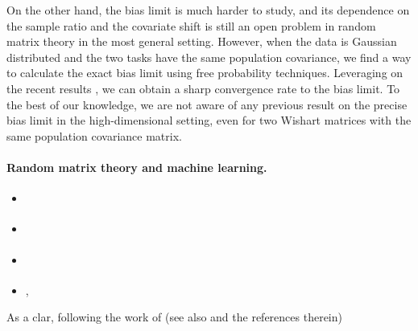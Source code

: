 On the other hand, the bias limit is much harder to study, and its dependence on the sample ratio and the covariate shift is still an open problem in random matrix theory in the most general setting. However, when the data is Gaussian distributed and the two tasks have the same population covariance, we find a way to calculate the exact bias limit using free probability techniques. Leveraging on the recent results \cite{BES_free1,BES_free2}, we can obtain a sharp convergence rate to the bias limit. To the best of our knowledge, we are not aware of any previous result on the precise bias limit in the high-dimensional setting, even for two Wishart matrices with the same population covariance matrix. 

\paragraph{Random matrix theory and machine learning.} 
\begin{itemize}
	\item \citet{hastie2019surprises}
	\item \citet{bartlett2020benign}
	\item \citet{liang2020just}
	\item \citet{montanari2019generalization}, \citet{liang2020precise}
\end{itemize}
\begin{remark}
    As a clar,  following the work of \citet{hastie2019surprises} (see also \citet{bartlett2020benign} and the references therein)
\end{remark}


